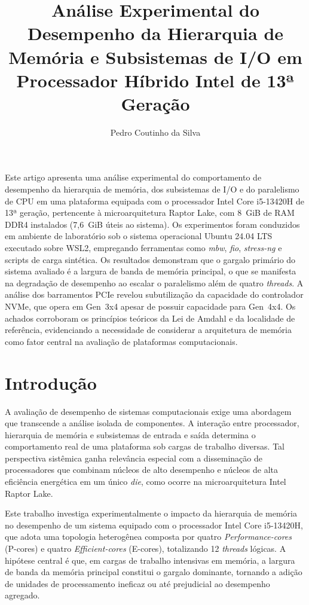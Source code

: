 \documentclass[12pt]{article}
\title{Análise Experimental do Desempenho da Hierarquia de Memória e Subsistemas de I/O em Processador Híbrido Intel de 13ª Geração}
\author{Pedro Coutinho da Silva\inst{1}}
\begin{document}
\maketitle

\begin{resumo}
Este artigo apresenta uma análise experimental do comportamento de desempenho da hierarquia de memória, dos subsistemas de I/O e do paralelismo de CPU em uma plataforma equipada com o processador Intel Core i5-13420H de 13ª geração, pertencente à microarquitetura Raptor Lake, com 8~GiB de RAM DDR4 instalados (7,6~GiB úteis ao sistema). Os experimentos foram conduzidos em ambiente de laboratório sob o sistema operacional Ubuntu 24.04 LTS executado sobre WSL2, empregando ferramentas como \textit{mbw}, \textit{fio}, \textit{stress-ng} e scripts de carga sintética. Os resultados demonstram que o gargalo primário do sistema avaliado é a largura de banda de memória principal, o que se manifesta na degradação de desempenho ao escalar o paralelismo além de quatro \textit{threads}. A análise dos barramentos PCIe revelou subutilização da capacidade do controlador NVMe, que opera em Gen~3x4 apesar de possuir capacidade para Gen~4x4. Os achados corroboram os princípios teóricos da Lei de Amdahl e da localidade de referência, evidenciando a necessidade de considerar a arquitetura de memória como fator central na avaliação de plataformas computacionais.
\end{resumo}

\section{Introdução}

A avaliação de desempenho de sistemas computacionais exige uma abordagem que transcende a análise isolada de componentes. A interação entre processador, hierarquia de memória e subsistemas de entrada e saída determina o comportamento real de uma plataforma sob cargas de trabalho diversas. Tal perspectiva sistêmica ganha relevância especial com a disseminação de processadores que combinam núcleos de alto desempenho e núcleos de alta eficiência energética em um único \textit{die}, como ocorre na microarquitetura Intel Raptor Lake.

Este trabalho investiga experimentalmente o impacto da hierarquia de memória no desempenho de um sistema equipado com o processador Intel Core i5-13420H, que adota uma topologia heterogênea composta por quatro \textit{Performance-cores} (P-cores) e quatro \textit{Efficient-cores} (E-cores), totalizando 12 \textit{threads} lógicas. A hipótese central é que, em cargas de trabalho intensivas em memória, a largura de banda da memória principal constitui o gargalo dominante, tornando a adição de unidades de processamento ineficaz ou até prejudicial ao desempenho agregado.
\end{document}
